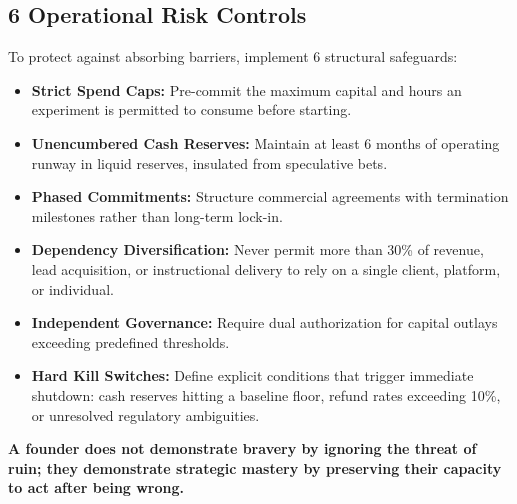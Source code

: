 \subsection{6 Operational Risk Controls}

To protect against absorbing barriers, implement 6 structural safeguards:
\begin{itemize}[leftmargin=10pt,itemsep=1pt,topsep=1pt]
  \item \textbf{Strict Spend Caps:} Pre-commit the maximum capital and hours an experiment is permitted to consume before starting.
  \item \textbf{Unencumbered Cash Reserves:} Maintain at least 6 months of operating runway in liquid reserves, insulated from speculative bets.
  \item \textbf{Phased Commitments:} Structure commercial agreements with termination milestones rather than long-term lock-in.
  \item \textbf{Dependency Diversification:} Never permit more than 30\% of revenue, lead acquisition, or instructional delivery to rely on a single client, platform, or individual.
  \item \textbf{Independent Governance:} Require dual authorization for capital outlays exceeding predefined thresholds.
  \item \textbf{Hard Kill Switches:} Define explicit conditions that trigger immediate shutdown: cash reserves hitting a baseline floor, refund rates exceeding 10\%, or unresolved regulatory ambiguities.
\end{itemize}

\textbf{A founder does not demonstrate bravery by ignoring the threat of ruin; they demonstrate strategic mastery by preserving their capacity to act after being wrong.}

